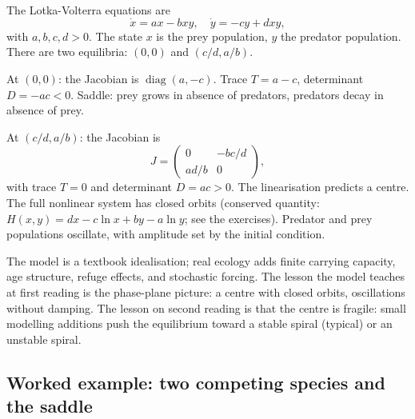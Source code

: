 The Lotka-Volterra equations are
\[
\dot{x} = a x - b x y, \quad \dot{y} = -c y + d x y,
\]
with $a, b, c, d > 0$. The state $x$ is the prey population, $y$
the predator population. There are two equilibria: $(0, 0)$ and
$(c/d, a/b)$.

At $(0, 0)$: the Jacobian is $\operatorname{diag}(a, -c)$. Trace
$T = a - c$, determinant $D = -a c < 0$. Saddle: prey grows in
absence of predators, predators decay in absence of prey.

At $(c/d, a/b)$: the Jacobian is
\[
J = \begin{pmatrix} 0 & -b c/d \\ a d/b & 0 \end{pmatrix},
\]
with trace $T = 0$ and determinant $D = a c > 0$. The linearisation
predicts a centre. The full nonlinear system has closed orbits
(conserved quantity: $H(x, y) = d x - c \ln x + b y - a \ln y$;
see the exercises). Predator and prey populations oscillate, with
amplitude set by the initial condition.

The model is a textbook idealisation; real ecology adds finite
carrying capacity, age structure, refuge effects, and stochastic
forcing. The lesson the model teaches at first reading is the
phase-plane picture: a centre with closed orbits, oscillations
without damping. The lesson on second reading is that the centre
is fragile: small modelling additions push the equilibrium toward
a stable spiral (typical) or an unstable spiral.

\subsection{Worked example: two competing species and the saddle}

